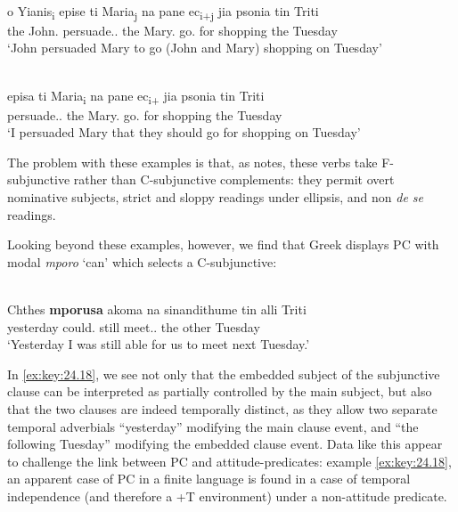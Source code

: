 \documentclass[output=paper]{langsci/langscibook}
\begin{document}
\ea%
    \label{ex:key:24.16}\\
	\gll o Yianis\textsubscript{i}       epise         ti Maria\textsubscript{j}       na     pane ec\textsubscript{i+j} jia psonia tin Triti\\
		the John.\Nom{}   persuade.\Tsg.\Pst{}    the Mary.\Acc{}    \Sbjv{} go.\Tpl{} {} for shopping the Tuesday\\
	\glt ‘John persuaded Mary to go (John and Mary) shopping on Tuesday’
\z

\ea%
    \label{ex:key:24.17}  \parencite[(34a), ((35a)]{Spyropoulos2007b}\\
	\gll episa       ti Maria\textsubscript{i}   na   pane ec\textsubscript{i+}   jia psonia tin Triti\\
        persuade.\Fsg{}.\Pst{}   the Mary.\Acc{} \Sbjv{} go.\Tpl{} {}  for shopping the Tuesday\\
	\glt ‘I persuaded Mary that they should go for shopping on Tuesday’\\
\z

The problem with these examples is that, as \citet{Varlokosta1994} notes, these
verbs take F-subjunctive rather than C-subjunctive complements: they permit
overt nominative subjects, strict and sloppy readings under
ellipsis, and non \emph{de se} readings.

Looking beyond these examples, however, we find that Greek displays
\gls{PC} with modal \emph{mporo} ‘can’ which
selects a C-subjunctive:

\ea%
    \label{ex:key:24.18} \\
	\gll Chthes   \textbf{mporusa}  akoma na     sinandithume tin alli Triti\\
        yesterday  could.\Fsg{}  still     \Sbjv{} meet.\Sbjv{}.\Fpl{}  the other Tuesday\\
	\glt ‘Yesterday I was still able for us to meet next Tuesday.’
\z

In \eqref{ex:key:24.18}, we see not only that the embedded subject of the subjunctive clause
can be interpreted as partially controlled by the main subject, but also that
the two clauses are indeed temporally distinct, as they allow two separate
temporal adverbials “yesterday” modifying the main clause event, and “the
following Tuesday” modifying the embedded clause event. Data like this appear
to challenge the link between \gls{PC} and
attitude-predicates: example \eqref{ex:key:24.18}, an apparent case of
\gls{PC} in a finite  language is found in a
case of temporal independence (and therefore a +T environment) under a
non-attitude predicate.
\end{document}
